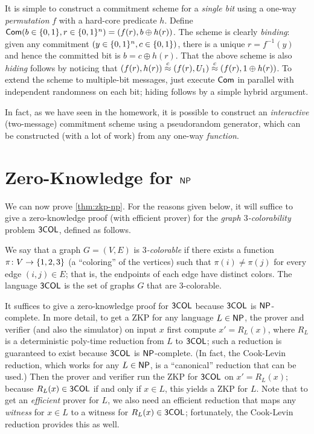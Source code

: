 \documentclass[11pt]{article}
\begin{document}
It is simple to construct a commitment scheme for a \emph{single bit}
using a one-way \emph{permutation} $f$ with a hard-core predicate $h$.
Define $\mathsf{Com}(b \in \{0,1\}, r \in \{0,1\}^n) = (f(r), b \oplus h(r))$.  The
scheme is clearly \textit{binding}: given any commitment $(y \in
\{0,1\}^{n}, c \in \{0,1\})$, there is a unique $r = f^{-1}(y)$ and hence
the committed bit is $b = c \oplus h(r)$.  That the above scheme is
also \emph{hiding} follows by noticing that $(f(r), h(r)) \stackrel{c}{\approx}
(f(r), U_1) \stackrel{c}{\approx} (f(r), 1 \oplus h(r))$.  To extend the scheme to
multiple-bit messages, just execute $\mathsf{Com}$ in parallel with
independent randomness on each bit; hiding follows by a simple hybrid
argument.

In fact, as we have seen in the homework, it is possible to construct
an \emph{interactive} (two-message) commitment scheme using a
pseudorandom generator, which can be constructed (with a lot of work)
from any one-way \emph{function}.

\section{Zero-Knowledge for $\mathsf{NP}$}
\label{sec:zero-knowledge-np}

\newcommand{\tcol}{\problem{3COL}}

We can now prove \cref{thm:zkp-np}.  For the reasons given
below, it will suffice to give a zero-knowledge proof (with efficient
prover) for the \emph{graph $3$-colorability} problem $\tcol$, defined
as follows.

\begin{definition}
  \label{def:3col}
  We say that a graph $G = (V,E)$ is \emph{$3$-colorable} if there
  exists a function $\pi \colon V \to \{1,2,3\}$ (a ``coloring'' of
  the vertices) such that $\pi(i) \neq \pi(j)$ for every edge $(i,j)
  \in E$; that is, the endpoints of each edge have distinct colors.
  The language $\tcol$ is the set of graphs $G$ that are
  $3$-colorable.
\end{definition}

It suffices to give a zero-knowledge proof for $\tcol$ because $\tcol$
is $\mathsf{NP}$-complete.  In more detail, to get a ZKP for any language $L
\in \mathsf{NP}$, the prover and verifier (and also the simulator) on input
$x$ first compute $x' = R_{L}(x)$, where $R_{L}$ is a deterministic
poly-time reduction from $L$ to $\tcol$; such a reduction is
guaranteed to exist because $\tcol$ is $\mathsf{NP}$-complete.  (In fact, the
Cook-Levin reduction, which works for any $L \in \mathsf{NP}$, is a
``canonical'' reduction that can be used.)  Then the prover and
verifier run the ZKP for $\tcol$ on $x' = R_{L}(x)$; because $R_{L}(x)
\in \tcol$ if and only if $x \in L$, this yields a ZKP for $L$.  Note
that to get an \emph{efficient} prover for $L$, we also need an
efficient reduction that maps any \emph{witness} for $x \in L$ to a
witness for $R_{L}(x) \in \tcol$; fortunately, the Cook-Levin
reduction provides this as well.
\end{document}
